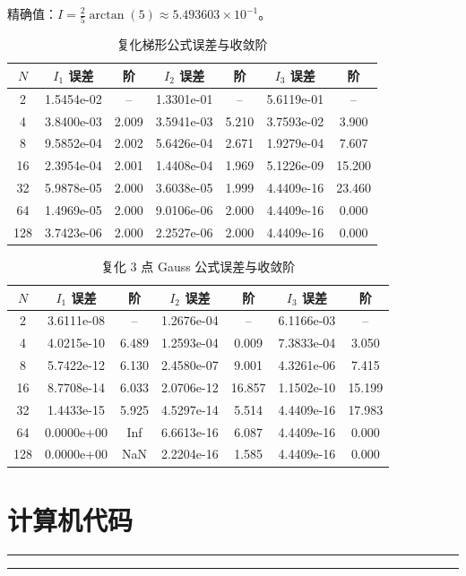 \documentclass[12pt,a4paper]{article}
\begin{document}
精确值：\(I = \frac{2}{5}\arctan(5) \approx 5.493603\times10^{-1}\)。

\begin{table}[htbp]
\centering
\caption{复化梯形公式误差与收敛阶}
\label{tab:trap}
\begin{tabular}{c c c c c c c}
\toprule
\(N\) & \(I_1\) 误差 & 阶 & \(I_2\) 误差 & 阶 & \(I_3\) 误差 & 阶 \\
\midrule
2   & 1.5454e-02 & -- & 1.3301e-01 & -- & 5.6119e-01 & -- \\
4   & 3.8400e-03 & 2.009 & 3.5941e-03 & 5.210 & 3.7593e-02 & 3.900 \\
8   & 9.5852e-04 & 2.002 & 5.6426e-04 & 2.671 & 1.9279e-04 & 7.607 \\
16  & 2.3954e-04 & 2.001 & 1.4408e-04 & 1.969 & 5.1226e-09 & 15.200 \\
32  & 5.9878e-05 & 2.000 & 3.6038e-05 & 1.999 & 4.4409e-16 & 23.460 \\
64  & 1.4969e-05 & 2.000 & 9.0106e-06 & 2.000 & 4.4409e-16 & 0.000 \\
128 & 3.7423e-06 & 2.000 & 2.2527e-06 & 2.000 & 4.4409e-16 & 0.000 \\
\bottomrule
\end{tabular}
\end{table}

\begin{table}[htbp]
\centering
\caption{复化 3 点 Gauss 公式误差与收敛阶}
\label{tab:gauss}
\begin{tabular}{c c c c c c c}
\toprule
\(N\) & \(I_1\) 误差 & 阶 & \(I_2\) 误差 & 阶 & \(I_3\) 误差 & 阶 \\
\midrule
2   & 3.6111e-08 & -- & 1.2676e-04 & -- & 6.1166e-03 & -- \\
4   & 4.0215e-10 & 6.489 & 1.2593e-04 & 0.009 & 7.3833e-04 & 3.050 \\
8   & 5.7422e-12 & 6.130 & 2.4580e-07 & 9.001 & 4.3261e-06 & 7.415 \\
16  & 8.7708e-14 & 6.033 & 2.0706e-12 & 16.857 & 1.1502e-10 & 15.199 \\
32  & 1.4433e-15 & 5.925 & 4.5297e-14 & 5.514 & 4.4409e-16 & 17.983 \\
64  & 0.0000e+00 & Inf   & 6.6613e-16 & 6.087 & 4.4409e-16 & 0.000 \\
128 & 0.0000e+00 & NaN   & 2.2204e-16 & 1.585 & 4.4409e-16 & 0.000 \\
\bottomrule
\end{tabular}
\end{table}

\newpage
\section{计算机代码}

\small
\hrule


\hrule
\end{document}
